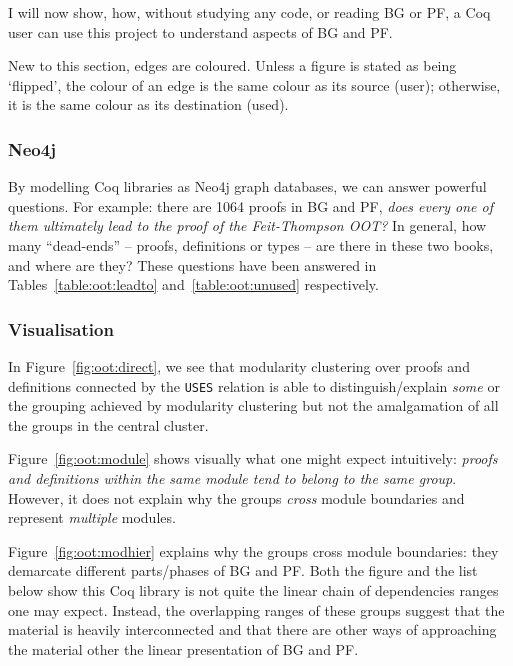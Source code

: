 I will now show, how, without studying any code, or reading BG or PF, a Coq
user can use this project to understand aspects of BG and PF.

New to this section, edges are coloured. Unless a figure is stated as being
`flipped', the colour of an edge is the same colour as its source (user);
otherwise, it is the same colour as its destination (used).

\subsubsection{Neo4j}

By modelling Coq libraries as Neo4j graph databases, we can answer powerful
questions. For example: there are 1064 proofs in BG and PF, \emph{does every
one of them ultimately lead to the proof of the Feit-Thompson OOT?} In
general, how many ``dead-ends'' -- proofs, definitions or types -- are there
in these two books, and where are they? These questions have been answered in
Tables~\ref{table:oot:leadto} and~\ref{table:oot:unused} respectively.

\begin{table}[tp]
  
\end{table}

\begin{table}[tp]
  
\end{table}

\subsubsection{Visualisation}\label{subsubsec:oot:visual}

In Figure~\ref{fig:oot:direct}, we see that modularity clustering over proofs
and definitions connected by the \texttt{USES} relation is able to
distinguish/explain \emph{some} or the grouping achieved by modularity
clustering but not the amalgamation of all the groups in the central cluster.

Figure~\ref{fig:oot:module} shows visually what one might expect intuitively:
\emph{proofs and definitions within the same module tend to belong to the same
group}. However, it does not explain why the groups \emph{cross} module
boundaries and represent \emph{multiple} modules.

Figure~\ref{fig:oot:modhier} explains why the groups cross module boundaries:
they demarcate different parts/phases of BG and PF. Both the figure and the list
below show this Coq library is not quite the linear chain of dependencies ranges
one may expect. Instead, the overlapping ranges of these groups suggest that the
material is heavily interconnected and that there are other ways of approaching
the material other the linear presentation of BG and PF.

